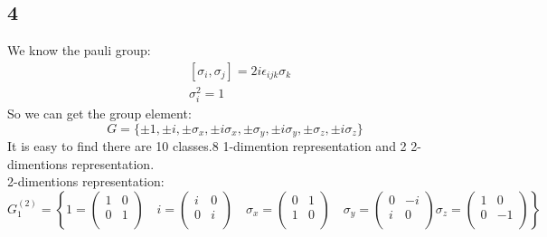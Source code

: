 \documentclass{article}
\begin{document}
\begin{CJK*}{GBK}{song}
\section{4}
We know the pauli group:
\begin{equation}
\begin{aligned}
&[\sigma_i,\sigma_j]=2i\epsilon_{ijk}\sigma_k\\
&\sigma_i^2=1
\end{aligned}
\end{equation}
So we can get the group element:
\begin{equation}
G=\{\pm 1,\pm i,\pm \sigma_x,\pm i\sigma_x,\pm \sigma_y,\pm i\sigma_y,\pm \sigma_z,\pm i\sigma_z\}
\end{equation}
It is easy to find there are 10 classes.8 1-dimention representation and 2 2-dimentions representation.\\
2-dimentions representation:
\begin{equation}
G_1^{(2)}=\left\{
1=
\begin{pmatrix}
     1  &  0 \\
     0  &  1 \\
\end{pmatrix}\quad
i=
\begin{pmatrix}
      i  &  0 \\
     0  &   i \\
\end{pmatrix}\quad
\sigma_x=
\begin{pmatrix}
     0  &  1 \\
     1  &  0 \\
\end{pmatrix}\quad
\sigma_y=
\begin{pmatrix}
     0  &  -i \\
     i   &  0 \\
\end{pmatrix}
\sigma_z=
\begin{pmatrix}
     1  &  0 \\
     0  & -1 \\
\end{pmatrix}
\right\}
\end{equation}


\end{CJK*}
\end{document}
